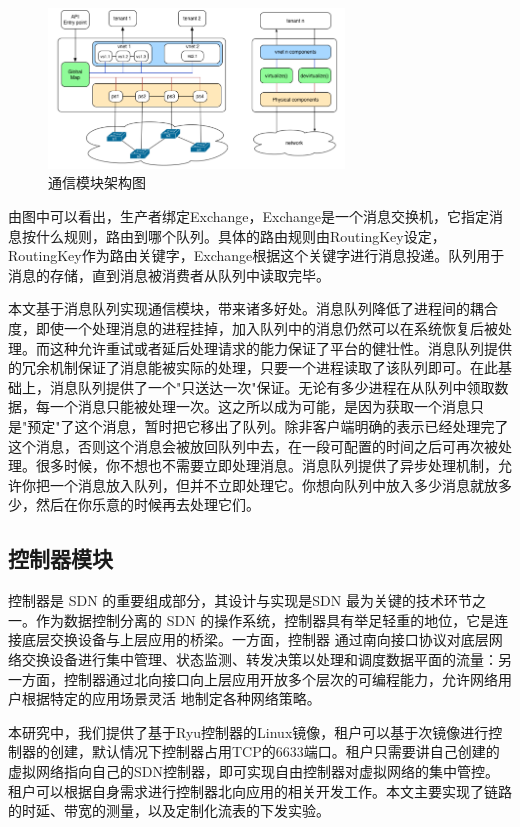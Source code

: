 \begin{figure}[!htb]
  \centering
  \includegraphics[width=0.7\textwidth]{logo/virtual-detail.png}
  \caption{通信模块架构图}
  \label{fig:rabbitmq}
\end{figure}

由图中可以看出，生产者绑定Exchange，Exchange是一个消息交换机，它指定消息按什么规则，路由到哪个队列。具体的路由规则由RoutingKey设定，RoutingKey作为路由关键字，Exchange根据这个关键字进行消息投递。队列用于消息的存储，直到消息被消费者从队列中读取完毕。

本文基于消息队列实现通信模块，带来诸多好处。消息队列降低了进程间的耦合度，即使一个处理消息的进程挂掉，加入队列中的消息仍然可以在系统恢复后被处理。而这种允许重试或者延后处理请求的能力保证了平台的健壮性。消息队列提供的冗余机制保证了消息能被实际的处理，只要一个进程读取了该队列即可。在此基础上，消息队列提供了一个"只送达一次"保证。无论有多少进程在从队列中领取数据，每一个消息只能被处理一次。这之所以成为可能，是因为获取一个消息只是"预定"了这个消息，暂时把它移出了队列。除非客户端明确的表示已经处理完了这个消息，否则这个消息会被放回队列中去，在一段可配置的时间之后可再次被处理。很多时候，你不想也不需要立即处理消息。消息队列提供了异步处理机制，允许你把一个消息放入队列，但并不立即处理它。你想向队列中放入多少消息就放多少，然后在你乐意的时候再去处理它们。

\subsection{控制器模块}
控制器是 SDN 的重要组成部分，其设计与实现是SDN 最为关键的技术环节之一。作为数据控制分离的
SDN 的操作系统，控制器具有举足轻重的地位，它是连接底层交换设备与上层应用的桥梁。一方面，控制器
通过南向接口协议对底层网络交换设备进行集中管理、状态监测、转发决策以处理和调度数据平面的流量：另
一方面，控制器通过北向接口向上层应用开放多个层次的可编程能力，允许网络用户根据特定的应用场景灵活
地制定各种网络策略。

本研究中，我们提供了基于Ryu控制器的Linux镜像，租户可以基于次镜像进行控制器的创建，默认情况下控制器占用TCP的6633端口。租户只需要讲自己创建的虚拟网络指向自己的SDN控制器，即可实现自由控制器对虚拟网络的集中管控。租户可以根据自身需求进行控制器北向应用的相关开发工作。本文主要实现了链路的时延、带宽的测量，以及定制化流表的下发实验。

